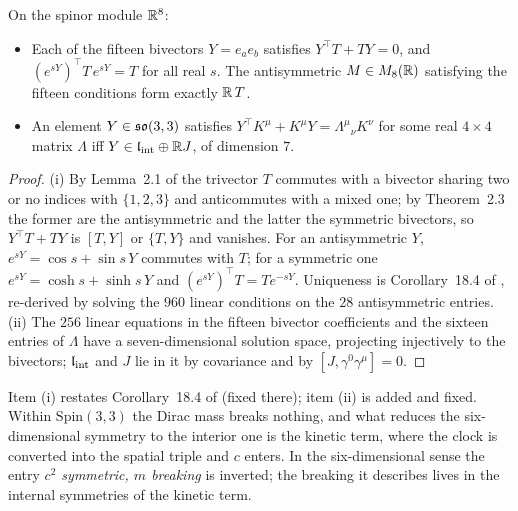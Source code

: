 \begin{proposition}
\label{d2:prop:Tinv}
On the spinor module $\mathbb{R}^8$:
\begin{itemize}
\item[(i)] Each of the fifteen bivectors $Y=e_ae_b$ satisfies $Y^{\!\top}T+TY=0$, and $(e^{sY})^{\!\top}T\,e^{sY}=T$ for all real $s$. The
antisymmetric $M\in M_8(\mathbb{R})$ satisfying the fifteen conditions form exactly $\mathbb{R}\,T$.
\item[(ii)] An element $Y\in\mathfrak{so}(3,3)$ satisfies $Y^{\!\top}K^\mu+K^\mu Y=\Lambda^\mu{}_\nu K^\nu$ for some real $4\times4$ matrix $\Lambda$ iff
$Y\in\mathfrak l_{\rm int}\oplus\mathbb{R} J$, of dimension $7$.
\end{itemize}
\end{proposition}

\begin{proof}
(i) By Lemma~2.1 of \cite{ES17} the trivector $T$ commutes with a bivector sharing two or no indices with $\{1,2,3\}$ and anticommutes with a mixed
one; by Theorem~2.3 the former are the antisymmetric and the latter the symmetric bivectors, so $Y^{\!\top}T+TY$ is $[T,Y]$ or $\{T,Y\}$ and
vanishes. For an antisymmetric $Y$, $e^{sY}=\cos s+\sin s\,Y$ commutes with $T$; for a symmetric one $e^{sY}=\cosh s+\sinh s\,Y$ and
$(e^{sY})^{\!\top}T=Te^{-sY}$. Uniqueness is Corollary~18.4 of \cite{ES17}, re-derived by solving the $960$ linear conditions on the $28$ antisymmetric
entries. (ii) The $256$ linear equations in the fifteen bivector coefficients and the sixteen entries of $\Lambda$ have a seven-dimensional solution
space, projecting injectively to the bivectors; $\mathfrak l_{\rm int}$ and $J$ lie in it by covariance and by $[J,\gamma^0\gamma^\mu]=0$.
\end{proof}

Item (i) restates Corollary~18.4 of \cite{ES17} (fixed there); item (ii) is added and fixed. Within $\mathrm{Spin}(3,3)$ the Dirac mass breaks nothing,
and what reduces the six-dimensional symmetry to the interior one is the kinetic term, where the clock is converted into the spatial triple and
$c$ enters. In the six-dimensional sense the entry \emph{$c^2$ symmetric, $m$ breaking} is inverted; the breaking it describes lives in the
internal symmetries of the kinetic term.

